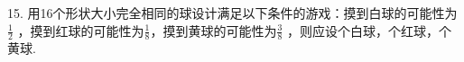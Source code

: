 15.	用16个形状大小完全相同的球设计满足以下条件的游戏：摸到白球的可能性为$\frac{1}{2}$ ，摸到红球的可能性为$\frac{1}{8}$，摸到黄球的可能性为$\frac{3}{8}$ ，则应设\key{\hspace{1cm}}个白球，\key{\hspace{1cm}}个红球，\key{\hspace{1cm}}个黄球.



